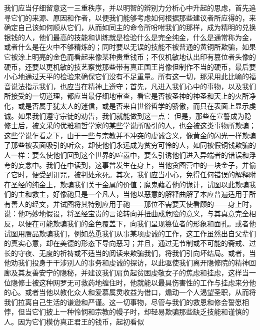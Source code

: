 我们应当仔细留意这一三重秩序，并以明智的辨别力分析心中升起的思虑，首先追寻它们的来源、原因和作者，以便我们能够考虑如何根据那些建议者所应得的，来确定自己该如何顺从它们，从而如同主的命令所吩咐我们的那样，成为精明的兑换银钱的人，他们最高的技能和训练就是检验什么是完全纯金，什么是通常称为金，或者什么是在火中不够精炼的；同时要以无误的技能不被普通的黄铜所欺骗，如果它被涂上明亮的金色而看起来像某种贵重钱币；不仅机敏地认出印有篡位者头像的硬币，还要以更机敏的技艺察觉那些带有真正国王肖像但制作不当的硬币，最后要小心地通过天平的检验来确保它们没有不足重量。所有这一切，那采用此比喻的福音说法指示我们，也应当在精神上遵守；首先，凡进入我们心中的事物，以及我们所接受的一切道理，都应当最仔细地审查，看它是否被圣神的神圣和天上的火所净化，或是否属于犹太人的迷信，或是否来自世俗哲学的骄傲，而只在表面上显示虔诚。如果我们遵守宗徒的劝告，我们就能做到这一点： 但是，那些在宣誓成为隐修士后，被文采的优雅和哲学家的某些学说所吸引的人，也会被这类事物所欺骗；这些学说乍看之下，由于一些与宗教并不冲突的虔诚含义，像黄金的闪光一样欺骗了那些被表面吸引的听众，却使他们永远成为贫穷可怜的人，如同被假铜钱欺骗的人一样：要么使他们回到这个世界的喧嚣中，要么引诱他们进入异端者的错误和浮夸的妄念中。我们在中读到，这事曾发生在身上，当他贪图营中的一块金子，并偷了它时，便受到诅咒，被判处永死。其次，我们应当小心，免得任何错误的解释附在圣经的纯金上，欺骗我们关于金属的价值；魔鬼藉着他的诡计，试图以此欺骗我们的主和救主，好像祂只是一个凡人，当他以恶意的解释曲解了本应普遍适用于所有善人的经文，并试图将其特别应用于祂——那位不需要天使看顾的——身上时，说：他巧妙地假设，将圣经宝贵的言论转向并扭曲成危险的意义，与其真意完全相反，以便在可能欺骗我们的金色覆盖下，向我们呈现篡位者的形象和面孔。或者他试图用赝品欺骗我们，例如怂恿我们从事某项虔诚的工作，这工作虽然出自父辈们的真实心意，却在美德的形态下导向恶习；并且，通过无节制或不可能的斋戒、过长的守夜、无度的祈祷或不适当的阅读来欺骗我们，将我们引向坏结局。或者，当他劝我们投身于干涉别人的事务和虔诚的探访，以此驱使我们离开隐修院的精神回廊及其友善安宁的隐秘，并建议我们肩负起贫困虔敬女子的焦虑和挂虑，这样当一位隐修士被这种网罗无可救药地缠住时，他就能以最具伤害性的工作与挂虑来分他的心。或者当他以教化众人和爱慕属灵收益为借口，煽动一个人渴望圣职，从而将我们拉离自己生活的谦逊和严谨。这一切事物，尽管与我们的救恩和修会誓愿相悖，但当它们披上一种怜悯和宗教的幔子时，却轻易欺骗那些缺乏技能和谨慎的人。因为它们模仿真正君王的钱币，起初看似